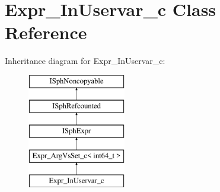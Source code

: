 \hypertarget{classExpr__InUservar__c}{\section{Expr\-\_\-\-In\-Uservar\-\_\-c Class Reference}
\label{classExpr__InUservar__c}
}
Inheritance diagram for Expr\-\_\-\-In\-Uservar\-\_\-c\-:\begin{figure}[H]
\begin{center}
\leavevmode
\includegraphics[height=5.000000cm]{classExpr__InUservar__c}
\end{center}
\end{figure}
